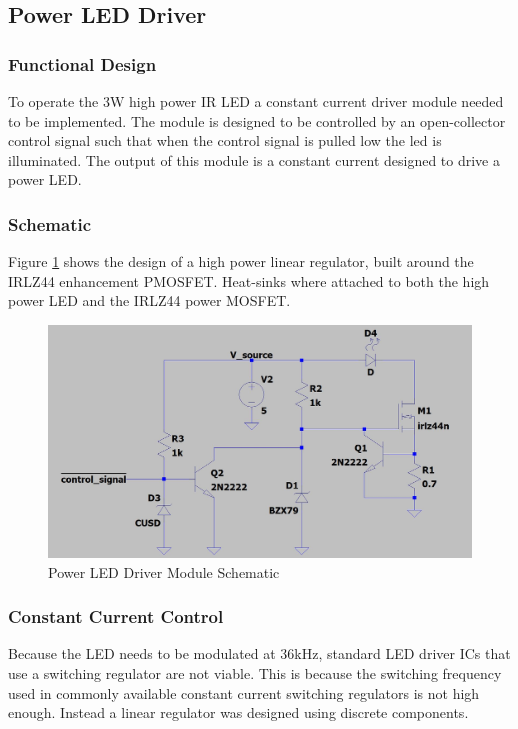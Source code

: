 


\subsection{Power LED Driver}

\subsubsection{Functional Design}
To operate the 3W high power IR LED a constant current driver module needed to be implemented. The module is designed to be controlled by an open-collector control signal such that when the control signal is pulled low the led is illuminated. The output of this module is a constant current designed to drive a power LED.

\subsubsection{Schematic}
Figure \ref{fig:schematic_power_led_driver} shows the design of a high power linear regulator, built around the IRLZ44 enhancement PMOSFET. Heat-sinks where attached to both the high power LED and the IRLZ44 power MOSFET.

\begin{figure}[H]
	\centering
	\includegraphics[width=.8\textwidth]{figures/design/power_led_driver.JPG}
	\caption{Power LED Driver Module Schematic}
	\label{fig:schematic_power_led_driver}
\end{figure}

\subsubsection{Constant Current Control}

Because the LED needs to be modulated at 36kHz, standard LED driver ICs that use a switching regulator are not viable. This is because the switching frequency used in commonly available constant current switching regulators is not high enough. Instead a linear regulator was designed using discrete components.

